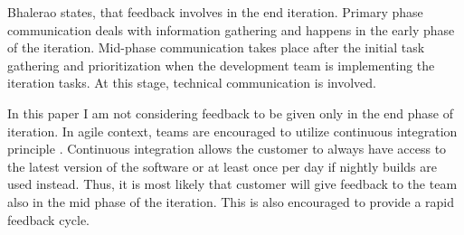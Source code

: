 \documentclass[conference]{IEEEtran}
\begin{document}
Bhalerao states, that feedback involves in the end iteration. Primary phase communication deals with information gathering and happens in the early phase of the iteration. Mid-phase communication takes place after the initial task gathering and prioritization when the development team is implementing the iteration tasks. At this stage, technical communication is involved. \cite{2010bhalerao}

In this paper I am not considering feedback to be given only in the end phase of iteration. In agile context, teams are encouraged to utilize continuous integration principle \cite{2002wake}. Continuous integration allows the customer to always have access to the latest version of the software or at least once per day if nightly builds are used instead. Thus, it is most likely that customer will give feedback to the team also in the mid phase of the iteration. This is also encouraged to provide a rapid feedback cycle.
\end{document}
